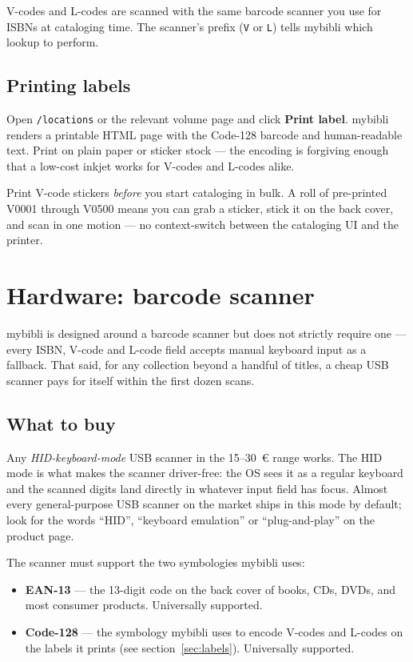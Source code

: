 V-codes and L-codes are scanned with the same barcode scanner you
use for ISBNs at cataloging time. The scanner's prefix
(\texttt{V} or \texttt{L}) tells mybibli which lookup to perform.

\subsection*{Printing labels}

Open \texttt{/locations} or the relevant volume page and click
\textbf{Print label}. mybibli renders a printable HTML page with the
Code-128 barcode and human-readable text. Print on plain paper or
sticker stock — the encoding is forgiving enough that a low-cost
inkjet works for V-codes and L-codes alike.

\begin{tip}
Print V-code stickers \emph{before} you start cataloging in bulk. A
roll of pre-printed V0001 through V0500 means you can grab a sticker,
stick it on the back cover, and scan in one motion — no
context-switch between the cataloging UI and the printer.
\end{tip}

\section{Hardware: barcode scanner}\label{sec:scanner-hardware}

mybibli is designed around a barcode scanner but does not strictly
require one — every ISBN, V-code and L-code field accepts manual
keyboard input as a fallback. That said, for any collection beyond
a handful of titles, a cheap USB scanner pays for itself within the
first dozen scans.

\subsection*{What to buy}

Any \emph{HID-keyboard-mode} USB scanner in
the 15--30~€ range works. The HID mode is what makes the
scanner driver-free: the OS sees it as a regular keyboard and the
scanned digits land directly in whatever input field has focus.
Almost every general-purpose USB scanner on the market ships in this
mode by default; look for the words ``HID'', ``keyboard
emulation'' or ``plug-and-play'' on the product page.

The scanner must support the two symbologies mybibli uses:

\begin{itemize}
  \item \textbf{EAN-13} — the 13-digit code on the
        back cover of books, CDs, DVDs, and most consumer products.
        Universally supported.
  \item \textbf{Code-128} — the symbology mybibli
        uses to encode V-codes and L-codes on the labels it prints
        (see section~\ref{sec:labels}). Universally supported.
\end{itemize}

